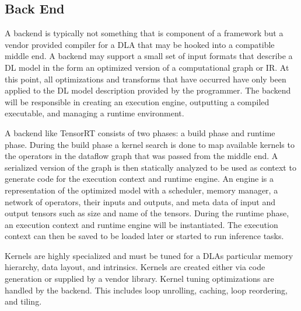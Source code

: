 \subsection{Back End}
A backend is typically not something that is component of a framework
but a vendor provided compiler for a DLA that may be hooked into a compatible
middle end. A backend may support a small set of input formats that describe
a DL model in the form an optimized version of a computational graph or IR.
At this point, all optimizations and transforms that have occurred have
only been applied to the DL model description provided by the programmer.
The backend will be responsible in creating
an execution engine, outputting a compiled executable, and managing
a runtime environment.

A backend like TensorRT \cite{tensorRT} consists of two phases: a build phase
and runtime phase. During the build phase a kernel search is done to map
available kernels to the operators in the dataflow graph that was passed from
the middle end. A serialized version of the graph is then statically analyzed to
be used as context to generate code for the execution context and runtime
engine.  An engine is a representation of the optimized model with a scheduler,
memory manager, a network of operators, their inputs and outputs, and meta data
of input and output tensors such as size and name of the tensors.  During the
runtime phase, an execution context and runtime engine will be instantiated.
The execution context can then be saved to be loaded later or started to run
inference tasks.

Kernels are highly specialized and must be tuned for a DLAs particular memory
hierarchy, data layout, and intrinsics. Kernels are created either via code
generation or supplied by a vendor library. Kernel tuning optimizations are
handled by the backend.  This includes loop unrolling, caching, loop
reordering, and tiling.
